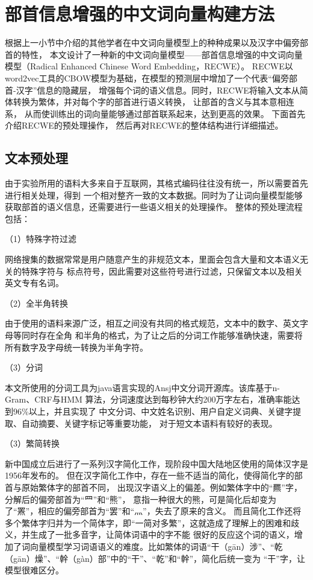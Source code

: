 \section{部首信息增强的中文词向量构建方法}
根据上一小节中介绍的其他学者在中文词向量模型上的种种成果以及汉字中偏旁部首的特性，
本文设计了一种新的中文词向量模型——部首信息增强的中文词向量模型（Radical Enhanced Chinese Word Embedding，RECWE）。
RECWE以word2vec工具的CBOW模型为基础，在模型的预测层中增加了一个代表“偏旁部首-汉字”信息的隐藏层，
增强每个词的语义信息。同时，RECWE将输入文本从简体转换为繁体，并对每个字的部首进行语义转换，
让部首的含义与其本意相连系，
从而使训练出的词向量能够通过部首联系起来，达到更高的效果。
下面首先介绍RECWE的预处理操作，
然后再对RECWE的整体结构进行详细描述。
\subsection{文本预处理}
由于实验所用的语料大多来自于互联网，其格式编码往往没有统一，所以需要首先进行相关处理，得到
一个相对整齐一致的文本数据。同时为了让词向量模型能够获取部首的语义信息，还需要进行一些语义相关的处理操作。
整体的预处理流程包括：

（1）特殊字符过滤

网络搜集的数据常常是用户随意产生的非规范文本，里面会包含大量和文本语义无关的特殊字符与
标点符号，因此需要对这些符号进行过滤，只保留文本以及相关英文专有名词。

（2）全半角转换

由于使用的语料来源广泛，相互之间没有共同的格式规范，文本中的数字、英文字母等同时存在全角
和半角的格式，为了让之后的分词工作能够准确快速，需要将所有数字及字母统一转换为半角字符。

（3）分词

本文所使用的分词工具为java语言实现的Ansj中文分词开源库。该库基于n-Gram、CRF与HMM
算法，分词速度达到每秒钟大约200万字左右，准确率能达到96\%以上，并且实现了
中文分词、中文姓名识别、用户自定义词典、关键字提取、自动摘要、关键字标记等重要功能，
对于短文本语料有较好的表现。

（3）繁简转换

新中国成立后进行了一系列汉字简化工作，现阶段中国大陆地区使用的简体汉字是1956年发布的。
但在汉字简化工作中，存在一些不适当的简化，使得简化字的部首与原始繁体字的部首不同，
出现汉字语义上的偏差。例如繁体字中的“羆”字，分解后的偏旁部首为“罒”和“熊”，
意指一种很大的熊，可是简化后却变为了“罴”，相应的偏旁部首为“罢”和“灬”，失去了原来的含义。
而且简化工作还将多个繁体字归并为一个简体字，即“一简对多繁”，这就造成了理解上的困难和歧义，并生成了一批多音字，让简体词语中的字不能
很好的反应这个词的语义，增加了词向量模型学习词语语义的难度。比如繁体的词语“干（gān）涉”、“乾（gān）燥”、“幹（gàn）部”中的“干”、“乾”和“幹”，简化后统一变为
“干”字，让模型很难区分。

